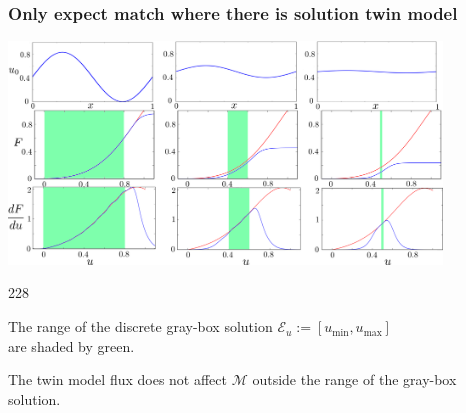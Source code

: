 \documentclass{beamer}
\newcommand{\barrow}{\item[\color{darkred}\ding{228}]}
\begin{document}
\begin{frame}
    \frametitle{Only expect match where there is solution \hfill \scriptsize{twin model}} \small
    \begin{center}
        \includegraphics[width=11.5cm]{combine_3_inits.png}
    \end{center}
     \begin{dinglist}{228}
        \barrow The range of the discrete gray-box solution $\mathcal{E}_u :=[u_{\min},u_{\max}]$ \\
                 are shaded by green.
        \barrow The twin model flux does not affect 
                $\mathcal{M}$ outside the range of the gray-box solution.
     \end{dinglist}
\end{frame}
\end{document}

